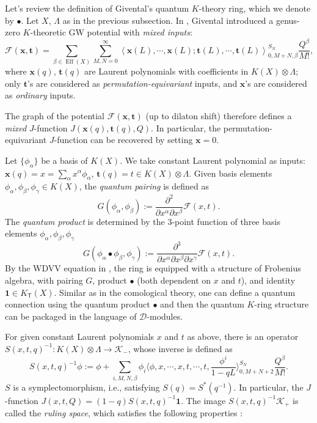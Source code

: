 \documentclass[10pt]{amsart}
\theoremstyle{definition}
\newcommand{\bt}{\mathbf{t}}
\newcommand{\bx}{\mathbf{x}}
\newcommand{\bone}{\mathbf{1}}
\newcommand{\cD}{\mathcal{D}}
\newcommand{\cF}{\mathcal{F}}
\newcommand{\cK}{\mathcal{K}}
\newcommand{\Eff}{\operatorname{Eff}}
\newcommand{\bT}{\mathsf{T}}
\theoremstyle{definition}
\numberwithin{equation}{section}
\theoremstyle{Theorem}
\begin{document}
Let's review the definition of Givental's quantum $K$-theory ring, which we denote by $\bullet$.  Let $X$, $\Lambda$ as in the previous subsection. In \cite{Giv7}, Givental introduced a genus-zero $K$-theoretic GW potential with \emph{mixed inputs}:
$$
\cF (\bx, \bt) = \sum_{\beta \in \Eff(X)} \sum_{M, N=0}^\infty \left\langle \bx (L) , \cdots, \bx (L); \bt (L) , \cdots, \bt (L) \right\rangle_{0, M+N, \beta}^{S_N}  \frac{Q^\beta}{M!},
$$
where $\bx (q)$, $\bt (q)$ are Laurent polynomials with coefficients in $K(X) \otimes \Lambda$; only $\bt$'s are considered as \emph{permutation-equivariant} inputs, and $\bx$'s are considered as \emph{ordinary} inputs.

The graph of the potential $\cF (\bx, \bt)$ (up to dilaton shift) therefore defines a \emph{mixed} $J$-function $J(\bx (q), \bt(q), Q)$. In particular, the permutation-equivariant $J$-function can be recovered by setting $\bx = 0$.

Let $\{\phi_\alpha\}$ be a basis of $K(X)$. We take constant Laurent polynomial as inputs: $\bx (q) = x = \sum_\alpha x^\alpha \phi_\alpha$, $\bt (q) = t \in K(X) \otimes \Lambda$. Given basis elements $\phi_\alpha, \phi_\beta, \phi_\gamma \in K (X)$, the \emph{quantum pairing} is defined as
$$
G (\phi_\alpha, \phi_\beta) := \frac{\partial^2}{\partial x^\alpha \partial x^\beta} \cF (x, t).
$$
The \emph{quantum product} is determined by the 3-point function of three basis elements $\phi_\alpha, \phi_\beta, \phi_\gamma$
$$
G (\phi_\alpha \bullet \phi_\beta, \phi_\gamma ) :=  \frac{\partial^3}{\partial x^\alpha \partial x^\beta \partial x^\gamma} \cF (x, t) .
$$
By the WDVV equation in \cite{Giv7}, the ring is equipped with a structure of Frobenius algebra, with pairing $G$, product $\bullet$ (both dependent on $x$ and $t$), and identity $\bone \in K_\bT (X)$. Similar as in the comological theory, one can define a quantum connection using the quantum product $\bullet$ and then the quantum $K$-ring structure can be packaged in the language of $\cD$-modules.

For given constant Laurent polynomials $x$ and $t$ as above, there is an operator $S (x, t, q)^{-1}: K(X) \otimes \Lambda \to \cK_-$, whose inverse is defined as
$$
S (x, t, q)^{-1} \phi := \phi + \sum_{i,  M, N, \beta} \phi_i \Big\langle \phi, x, \cdots, x, t, \cdots, t, \frac{\phi^i}{1 - qL} \Big\rangle_{0, M+N+2}^{S_N}  \frac{Q^\beta}{M!}.
$$
$S$ is a symplectomorphism, i.e., satisfying $S(q) = S^* (q^{-1})$. In particular, the $J$-function $J(x, t, Q) = (1-q) S (x, t, q)^{-1} \bone$. The image $S(x, t, q)^{-1} \cK_+$ is called the \emph{ruling space}, which satisfies the following properties \cite{Giv7, Giv8}:
\end{document}
